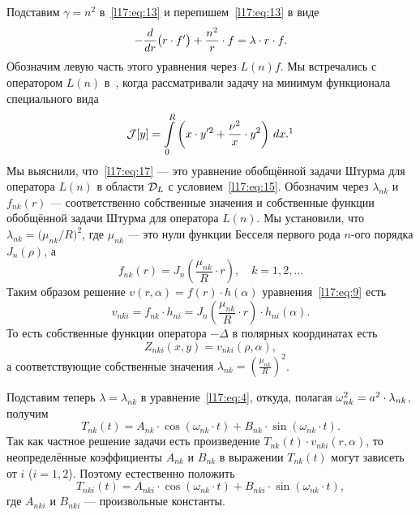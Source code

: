 Подставим $\gamma=n^2$ в~\eqref{l17:eq:13} и перепишем~\eqref{l17:eq:13} в виде
\begin{equation}\label{l17:eq:17}
	-\frac{d}{dr}\big(r\cdot f'\big)+\frac{n^2}{r}\cdot f=\lambda\cdot r\cdot f.
\end{equation}
Обозначим левую часть этого уравнения через $L(n)f$. Мы встречались с оператором $L(n)$ в~\cite{VI}, когда рассматривали задачу на минимум функционала специального вида 
\begin{equation*}
	\J[y]=\int\limits_{0}^{R}\left(x\cdot y'^2+\frac{\nu^2}{x}\cdot y^2\right)\,dx.\footnotemark{}
\end{equation*}%
Мы выяснили, что~\eqref{l17:eq:17} --- это уравнение обобщённой задачи Штурма для оператора $L(n)$ в области $\mathcal{D}_{L}$ с условием~\eqref{l17:eq:15}. Обозначим через $\lambda_{nk}$ и $f_{nk}(r)$ --- соответственно собственные значения и собственные функции обобщённой задачи Штурма для оператора $L(n)$. Мы установили, что $\lambda_{nk}=\big(\mu_{nk}/R\big)^2$, где $\mu_{nk}$ --- это нули функции Бесселя первого рода $n$-ого порядка $J_n(\rho)$, а
\begin{equation*}
	 f_{nk}(r)=J_n\left(\frac{\mu_{nk}}{R}\cdot r\right),\quad k=1,2,\ldots
\end{equation*}  
Таким образом решение $v(r,\alpha)=f(r)\cdot h(\alpha)$ уравнения~\eqref{l17:eq:9} есть
\begin{equation}\label{l17:eq:18}
	 v_{nki}=f_{nk}\cdot h_{ni}=J_{n}\left(\frac{\mu_{nk}}{R}\cdot r\right)\cdot h_{ni}(\alpha).
\end{equation}
То есть собственные функции оператора $-\Delta$ в полярных координатах есть
\begin{equation*}
	 Z_{nki}(x,y)=v_{nki}(\rho,\alpha),
\end{equation*}
а соответствующие собственные значения $\displaystyle\lambda_{nk}=\left(\frac{\mu_{nk}}{R}\right)^2$. 

Подставим теперь $\lambda=\lambda_{nk}$ в уравнение~\eqref{l17:eq:4}, откуда, полагая $\omega_{nk}^2\?=a^2\cdot\lambda_{nk}$, получим
\begin{equation*}
	 T_{nk}(t)=A_{nk}\cdot\cos\left(\omega_{nk}\cdot t\right)+B_{nk}\cdot\sin\left(\omega_{nk}\cdot t\right).
\end{equation*}
Так как частное решение задачи есть произведение $T_{nk}(t)\cdot v_{nki}(r,\alpha)$, то неопределённые коэффициенты $A_{nk}$ и $B_{nk}$ в выражении $T_{nk}(t)$ могут зависеть от $i$ ($i=1,2$). Поэтому естественно положить 
\begin{equation*}
	 T_{nki}(t)=A_{nki}\cdot\cos\left(\omega_{nk}\cdot t\right)+B_{nki}\cdot\sin\left(\omega_{nk}\cdot t\right),
\end{equation*}
где $A_{nki}$ и $B_{nki}$ --- произвольные константы. 

